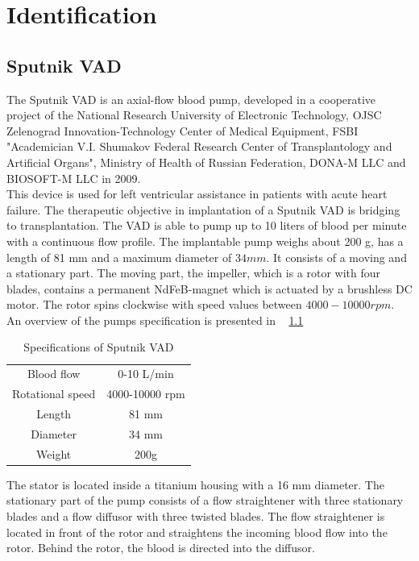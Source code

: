 \chapter{Identification}
\section{Sputnik VAD}
The Sputnik VAD is an axial-flow blood pump, developed in a cooperative project of the National Research University of Electronic Technology, OJSC Zelenograd Innovation-Technology Center of Medical Equipment, FSBI "Academician V.I. Shumakov Federal Research Center of Transplantology and Artificial Organs", Ministry of Health of Russian Federation, DONA-M LLC and BIOSOFT-M LLC in 2009. \cite{Sputnik1}
\\This device is used for left ventricular assistance in patients with acute heart failure. The therapeutic objective in implantation of a Sputnik VAD is bridging to transplantation. The VAD is able to pump up to 10 liters of blood per minute with a continuous flow profile. The implantable pump weighs about 200 g, has a length of 81 mm and a maximum diameter of $34 mm$. It consists of a moving and a stationary part. The moving part, the impeller, which is a rotor with four blades, contains a permanent NdFeB-magnet which is actuated by a brushless DC motor. The rotor spins clockwise with speed values between $4000-10000 rpm$. An overview of the pumps specification is presented in \tablename~ \ref{tab:sput1}
\begin{table}[h]
  \centering
  \begin{tabular}{c|c}
    \toprule
    Blood flow  & 0-10 L/min \\
    Rotational speed & 4000-10000 rpm \\
    Length & 81 mm \\
    Diameter & 34 mm \\
    Weight & 200g \\
    \bottomrule
\end{tabular}
  \caption[Specifications of Sputnik VAD]{Specifications of Sputnik VAD}
  \label{tab:sput1}
\end{table}
The stator is located inside a titanium housing with a 16 mm diameter. The stationary part of the pump consists of a flow straightener with three stationary blades and a flow diffusor with three twisted blades. The flow straightener is located in front of the rotor and straightens the incoming blood flow into the rotor. Behind the rotor, the blood is directed into the diffusor. %
